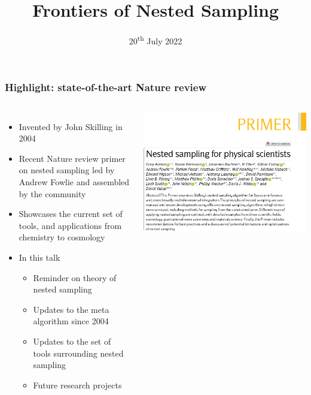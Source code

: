 \documentclass[aspectratio=169,handout]{beamer}
\title{Frontiers of Nested Sampling}
\date{20\textsuperscript{th} July 2022}
\begin{document}
\begin{frame}
    \titlepage
\end{frame}

\begin{frame}
    \frametitle{Highlight: state-of-the-art Nature review}
    \begin{columns}
        \begin{itemize}
            \item Invented by John Skilling in 2004
            \item Recent Nature review primer on nested sampling led by Andrew Fowlie and assembled by the community
            \item Showcases the current set of tools, and applications from chemistry to cosmology
            \item In this talk
                \begin{itemize}
                    \item Reminder on theory of nested sampling
                    \item Updates to the meta algorithm since 2004
                    \item Updates to the set of tools surrounding nested sampling
                    \item Future research projects
                \end{itemize}
        \end{itemize}
        \includegraphics[width=\textwidth]{figures/nature1}

\end{columns}
\end{frame}
\end{document}
